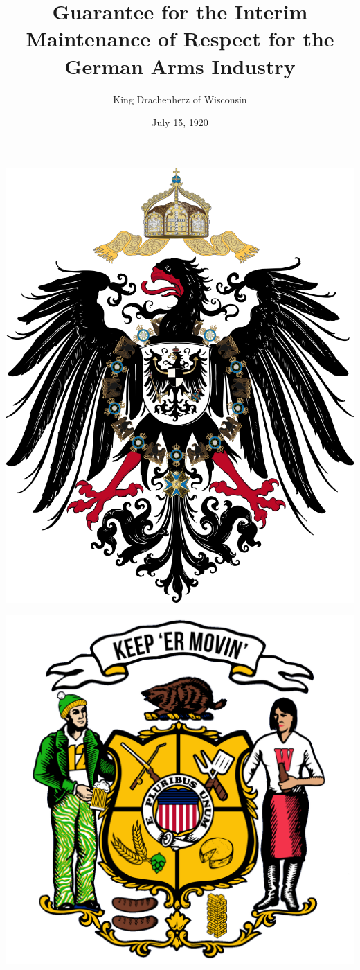 \documentclass{article}
\title{Guarantee for the Interim Maintenance of Respect for the German Arms Industry}
\author{King Drachenherz of Wisconsin}
\date{July 15, 1920}
\begin{document}
\maketitle
\begin{center}
    \begin{minipage}{0.45\textwidth}
        \centering
        \includegraphics[scale=.15]{dr_wappen}
    \end{minipage}
    \hfill
    \begin{minipage}{0.45\textwidth}
        \centering
        \includegraphics[scale=.10]{wi_wappen.png}

\end{minipage}
\end{center}
\end{document}
